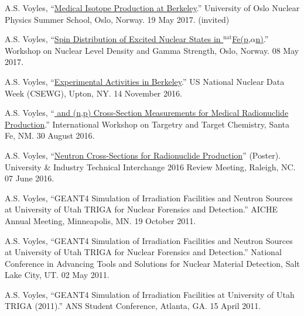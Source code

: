 \begin{bibsection}
\item A.S. Voyles, \enquote{\href{https://github.com/avoyles/presentations/blob/master/2017-05-19-oslo_summer_school/Voyles_19_May_2017_Oslo_Summer_School.pdf}{Medical Isotope Production at Berkeley}.} University of Oslo Nuclear Physics Summer School, Oslo, Norway.  19 May 2017. (invited)

\item A.S. Voyles, \enquote{\href{http://tid.uio.no/workshop2017/talks/OsloWS17_Voyles.pdf}{Spin Distribution of Excited Nuclear States in $^{\text{nat}}$Fe(p,$\alpha$n)}.}  Workshop on Nuclear Level Density and Gamma Strength, Oslo, Norway. 08 May 2017.


\item A.S. Voyles, \enquote{\href{https://indico.bnl.gov/event/1743/contributions/3189/}{Experimental Activities in Berkeley}.} US National Nuclear Data Week  (CSEWG), Upton, NY. 14 November 2016.


\item A.S. Voyles, \enquote{\href{https://slideslive.com/38898186/64cu-and-47scnp-crosssection-measurements-for-medical-radionuclide-production}{ and  (n,p) Cross-Section Measurements for Medical Radionuclide Production}.}  International Workshop on Targetry and Target Chemistry, Santa Fe, NM. 30 August 2016.

\item A.S. Voyles, \enquote{\href{https://github.com/avoyles/posters/blob/master/2016-06-07-UITI/Voyles_UITI2016_Poster_OsloUpdate.pdf}{Neutron Cross-Sections for Radionuclide Production}} (Poster).  University \& Industry Technical Interchange 2016 Review Meeting, Raleigh, NC. 07 June 2016.

\item A.S. Voyles, \enquote{GEANT4 Simulation of Irradiation Facilities and Neutron Sources at University of Utah TRIGA for
Nuclear Forensics and Detection.}  AICHE Annual Meeting, Minneapolis, MN. 19 October 2011.

\item A.S. Voyles, \enquote{GEANT4 Simulation of Irradiation Facilities and Neutron Sources at University of Utah TRIGA for
Nuclear Forensics and Detection.}   National Conference in Advancing Tools and Solutions for
Nuclear Material Detection, Salt Lake City, UT. 02 May 2011.

\item A.S. Voyles, \enquote{GEANT4 Simulation of Irradiation Facilities at University of Utah TRIGA (2011).} 
ANS Student Conference, Atlanta, GA. 15 April 2011.

\end{bibsection}

